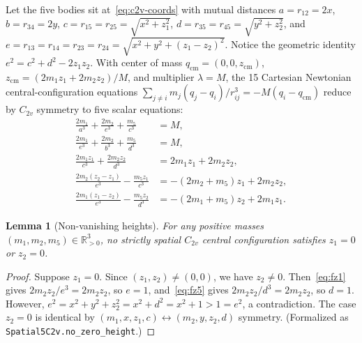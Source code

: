 \documentclass[11pt,a4paper]{amsart}
\newtheorem{lemma}[theorem]{Lemma}
\theoremstyle{definition}
\theoremstyle{remark}
\newcommand{\R}{\mathbb{R}}
\begin{document}
Let the five bodies sit at~\eqref{eq:c2v-coords} with mutual distances
$a = r_{12} = 2x$, $b = r_{34} = 2y$, $c = r_{15} = r_{25} = \sqrt{x^2 + z_1^2}$,
$d = r_{35} = r_{45} = \sqrt{y^2 + z_2^2}$, and
$e = r_{13} = r_{14} = r_{23} = r_{24} = \sqrt{x^2 + y^2 + (z_1 - z_2)^2}$.
Notice the geometric identity $e^2 = c^2 + d^2 - 2 z_1 z_2$.
With center of mass $q_{\mathrm{cm}} = (0, 0, z_{\mathrm{cm}})$,
$z_{\mathrm{cm}} = (2 m_1 z_1 + 2 m_2 z_2)/M$, and multiplier $\lambda = M$, the 15
Cartesian Newtonian central-configuration equations
$\sum_{j \neq i} m_j (q_j - q_i)/r_{ij}^3 = -M (q_i - q_{\mathrm{cm}})$ reduce by
$C_{2v}$ symmetry to five scalar equations:
\begin{align}
  \frac{2 m_1}{a^3} + \frac{2 m_2}{e^3} + \frac{m_5}{c^3} &= M, \label{eq:fx1}\\
  \frac{2 m_1}{e^3} + \frac{2 m_2}{b^3} + \frac{m_5}{d^3} &= M, \label{eq:fy3}\\
  \frac{2 m_1 z_1}{c^3} + \frac{2 m_2 z_2}{d^3} &= 2 m_1 z_1 + 2 m_2 z_2, \label{eq:fz5}\\
  \frac{2 m_2 (z_2 - z_1)}{e^3} - \frac{m_5 z_1}{c^3} &= -(2 m_2 + m_5) z_1 + 2 m_2 z_2, \label{eq:fz1}\\
  \frac{2 m_1 (z_1 - z_2)}{e^3} - \frac{m_5 z_2}{d^3} &= -(2 m_1 + m_5) z_2 + 2 m_1 z_1. \label{eq:fz3}
\end{align}

\begin{lemma}[Non-vanishing heights]\label{lem:no-zero-z}
For any positive masses $(m_1, m_2, m_5) \in \R_{>0}^3$, no strictly spatial $C_{2v}$
central configuration satisfies $z_1 = 0$ or $z_2 = 0$.
\end{lemma}

\begin{proof}
Suppose $z_1 = 0$. Since $(z_1, z_2) \neq (0,0)$, we have $z_2 \neq 0$.
Then~\eqref{eq:fz1} gives $2 m_2 z_2 / e^3 = 2 m_2 z_2$, so $e = 1$, and~\eqref{eq:fz5}
gives $2 m_2 z_2 / d^3 = 2 m_2 z_2$, so $d = 1$.
However, $e^2 = x^2 + y^2 + z_2^2 = x^2 + d^2 = x^2 + 1 > 1 = e^2$, a contradiction.
The case $z_2 = 0$ is identical by $(m_1, x, z_1, c) \leftrightarrow (m_2, y, z_2, d)$
symmetry. (Formalized as \texttt{Spatial5C2v.no\_zero\_height}.)
\end{proof}
\end{document}
